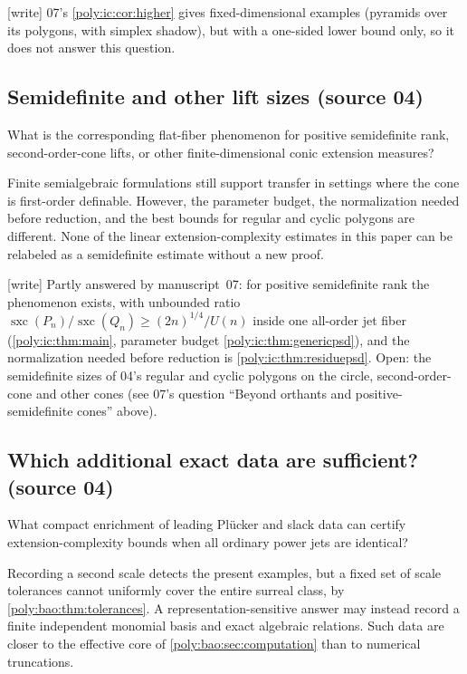 \documentclass[11pt,a4paper]{article}
\numberwithin{equation}{section}
\theoremstyle{plain}
\newcommand{\wtag}{\textup{[write]}}%
\newcommand{\sx}{\operatorname{sxc}}
\begin{document}
\wtag{} 07's \cref{poly:ic:cor:higher} gives fixed-dimensional examples
(pyramids over its polygons, with simplex shadow), but with a one-sided
lower bound only, so it does not answer this question.

\subsection{Semidefinite and other lift sizes (source 04)}
\begin{question}
What is the corresponding flat-fiber phenomenon for positive
semidefinite rank, second-order-cone lifts, or other finite-dimensional
conic extension measures?
\end{question}
Finite semialgebraic formulations still support transfer in settings
where the cone is first-order definable. However, the parameter budget,
the normalization needed before reduction, and the best bounds for
regular and cyclic polygons are different. None of the linear
extension-complexity estimates in this paper can be relabeled as a
semidefinite estimate without a new proof.

\wtag{} Partly answered by manuscript~07: for positive semidefinite rank
the phenomenon exists, with unbounded ratio
$\sx(P_n)/\sx(Q_n)\geq(2n)^{1/4}/U(n)$ inside one all-order jet fiber
(\cref{poly:ic:thm:main}, parameter budget \cref{poly:ic:thm:genericpsd}),
and the normalization needed before reduction is
\cref{poly:ic:thm:residuepsd}. Open: the semidefinite sizes of 04's regular
and cyclic polygons on the circle, second-order-cone and other cones (see
07's question ``Beyond orthants and positive-semidefinite cones'' above).

\subsection{Which additional exact data are sufficient? (source 04)}
\begin{question}
What compact enrichment of leading Pl\"ucker and slack data can certify
extension-complexity bounds when all ordinary power jets are identical?
\end{question}
Recording a second scale detects the present examples, but a fixed set
of scale tolerances cannot uniformly cover the entire surreal class,
by \cref{poly:bao:thm:tolerances}. A representation-sensitive answer may instead
record a finite independent monomial basis and exact algebraic
relations. Such data are closer to the effective core of
\cref{poly:bao:sec:computation} than to numerical truncations.
\end{document}
